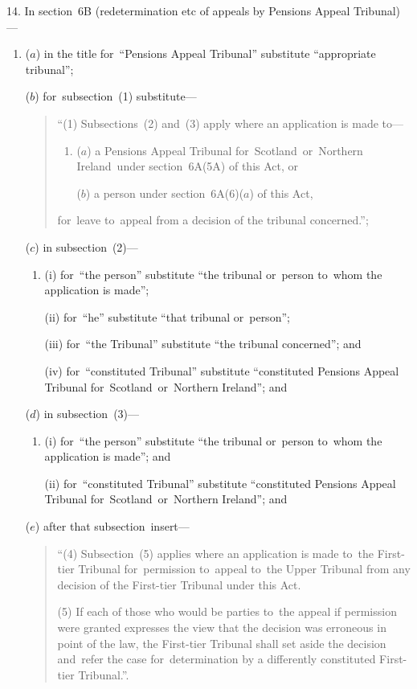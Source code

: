 \documentclass[12pt,a4paper]{article}
\begin{document}
14.  In section~6B (redetermination etc of appeals by Pensions Appeal Tribunal)—
\begin{enumerate}\item[]
($a$) in the title for~“Pensions Appeal Tribunal” substitute “appropriate tribunal”;

($b$) for~subsection~(1) substitute—
\begin{quotation}
“(1) Subsections~(2) and~(3) apply where an application is made to—
\begin{enumerate}\item[]
($a$) a Pensions Appeal Tribunal for~Scotland~or~Northern Ireland~under section~6A(5A) of this Act, or

($b$) a person under section~6A(6)($a$)  of this Act,
\end{enumerate}
for~leave to~appeal from a decision of the tribunal concerned.”;
\end{quotation}

($c$) in subsection~(2)—
\begin{enumerate}\item[]
(i) for~“the person” substitute “the tribunal or~person to~whom the application is made”;

(ii) for~“he” substitute “that tribunal or~person”;

(iii) for~“the Tribunal” substitute “the tribunal concerned”; and

(iv)  for~“constituted Tribunal” substitute “constituted Pensions Appeal Tribunal for~Scotland~or~Northern Ireland”; and
\end{enumerate}

($d$) in subsection~(3)—
\begin{enumerate}\item[]
(i) for~“the person” substitute “the tribunal or~person to~whom the application is made”; and

(ii) for~“constituted Tribunal” substitute “constituted Pensions Appeal Tribunal for~Scotland~or~Northern Ireland”; and
\end{enumerate}

($e$) after that subsection~insert—
\begin{quotation}
“(4) Subsection~(5) applies where an application is made to~the First-tier Tribunal for~permission to~appeal to~the Upper Tribunal from any decision of the First-tier Tribunal under this Act.

(5) If each of those who would be parties to~the appeal if permission were granted expresses the view that the decision was erroneous in point of the law, the First-tier Tribunal shall set aside the decision and~refer the case for~determination by a differently constituted First-tier Tribunal.”.
\end{quotation}
\end{enumerate}
\end{document}

